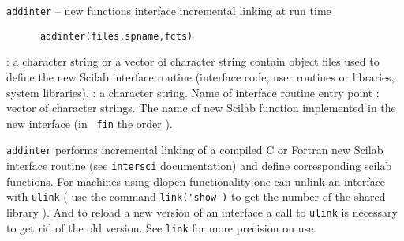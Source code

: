 
\begin{mandesc}
  \texttt{addinter} --  new functions interface incremental linking at run time\\ %
\end{mandesc}
\label{addinter}
\begin{calling_sequence}
\begin{verbatim}
      addinter(files,spname,fcts)  
\end{verbatim}
\end{calling_sequence}
\begin{parameters}
  \begin{varlist}
     : a character string or a vector of character string contain object files used to define the new Scilab interface routine (interface code, user routines or libraries, system libraries).
     : a character string. Name of interface routine entry point
     : vector of character strings. The name of new Scilab function implemented in the new interface (in \verb! fin! the order ).
  \end{varlist}
\end{parameters}
\begin{mandescription}
  \verb!addinter! performs incremental linking of a compiled C or Fortran
  new Scilab interface routine (see \verb!intersci! documentation)
  and define corresponding scilab functions.
  For machines using dlopen functionality one can unlink an interface 
  with \verb!ulink! ( use the command \verb!link('show')! to get the number 
  of the shared library ). And to reload a new version of an interface a call to \verb!ulink! is 
  necessary to get rid of the old version.
  See \verb!link! for more precision on use.
\end{mandescription}
\begin{manseealso}
       
\end{manseealso}

